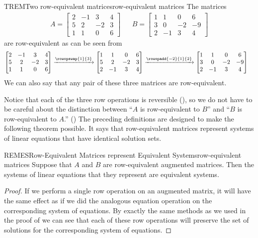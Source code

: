 %
\begin{example}{TREM}{Two row-equivalent matrices}{row-equivalent matrices}
The matrices
\begin{align*}
A=\begin{bmatrix}
2&-1&3&4\\
5&2&-2&3\\
1&1&0&6
\end{bmatrix}
&&
B=\begin{bmatrix}
1&1&0&6\\
3&0&-2&-9\\
2&-1&3&4
\end{bmatrix}
\end{align*}
are row-equivalent as can be seen from
\begin{align*}
\begin{bmatrix}
2&-1&3&4\\
5&2&-2&3\\
1&1&0&6
\end{bmatrix}
%
\xrightarrow{\rowopswap{1}{3}}
\begin{bmatrix}
1&1&0&6\\
5&2&-2&3\\
2&-1&3&4
\end{bmatrix}
&
%
\xrightarrow{\rowopadd{-2}{1}{2}}
\begin{bmatrix}
1&1&0&6\\
3&0&-2&-9\\
2&-1&3&4
\end{bmatrix}
\end{align*}
We can also say that any pair of these three matrices are row-equivalent.
\end{example}
%
Notice that each of the three row operations is reversible (), so we do not have to be careful about the distinction between ``$A$ is row-equivalent to $B$'' and ``$B$ is row-equivalent to $A$.'' ()
%
The preceding definitions are designed to make the following theorem possible.  It says that row-equivalent matrices represent systems of linear equations that have identical solution sets.
%
\begin{theorem}{REMES}{Row-Equivalent Matrices represent Equivalent Systems}{row-equivalent matrices}
Suppose that $A$ and $B$ are row-equivalent augmented matrices.  Then the systems of linear equations that they represent are equivalent systems.
\end{theorem}
%
\begin{proof}
If we perform a single row operation on an augmented matrix, it will have the same effect as if we did the analogous equation operation on the corresponding system of equations.  By exactly the same methods as we used in the proof of  we can see that each of these row operations will preserve the set of solutions for the corresponding system of equations.
\end{proof}
